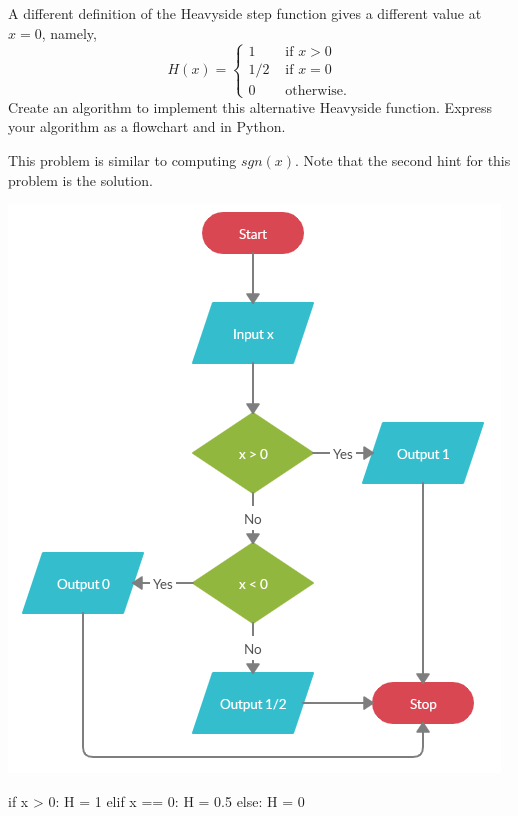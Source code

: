 \documentclass{ximera}
\begin{document}
\begin{question}
A different definition of the Heavyside step function gives a different value at $x=0$, namely,
	$$H(x)=\begin{cases} 1 &\text{ if $x>0$}\\
		1/2 &\text{ if $x=0$}\\
		0 &\text{ otherwise.}
	\end{cases}$$
Create an algorithm to implement this alternative Heavyside function. Express your algorithm as a flowchart and in Python.
	\begin{hint}
		This problem is similar to computing $sgn(x)$. Note that the second hint for this problem is the solution.
	\end{hint}
	\begin{hint}
	\begin{center}
		\includegraphics{heavy2.png}
	\end{center}
\begin{sageCell}
if x > 0:
        H = 1
elif x == 0:
        H = 0.5
else:
        H = 0
\end{sageCell}
	\end{hint}
\end{question}
\end{document}
